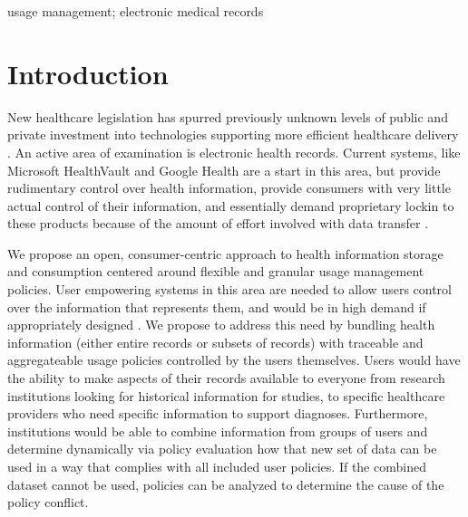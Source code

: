 \documentclass[10pt, conference, compsocconf]{IEEEtran}
\begin{document}
\begin{IEEEkeywords}
usage management; electronic medical records

\end{IEEEkeywords}


%
\IEEEpeerreviewmaketitle

\section{Introduction}
New healthcare legislation has spurred previously unknown levels of public and private investment into technologies supporting more efficient healthcare delivery \cite{Emr:Web:Recovery}.   An active area of examination is electronic health records.  Current systems, like Microsoft HealthVault and Google Health are a start in this area, but provide rudimentary control over health information, provide consumers with very little actual control of their information, and essentially demand proprietary lockin to these products because of the amount of effort involved with data transfer \cite{Emr:EvaluationHealthInf}.

We propose an open, consumer-centric approach to health information storage and consumption centered around flexible and granular usage management policies.  User empowering systems in this area are needed to allow users control over the information that represents them, and would be in high demand if appropriately designed \cite{Emr:PyAmWaCr}.  We propose to address this need by bundling health information (either entire records or subsets of records) with traceable and aggregateable usage policies controlled by the users themselves.  Users would have the ability to make aspects of their records available to everyone from research institutions looking for historical information for studies, to specific healthcare providers who need specific information to support diagnoses.  Furthermore, institutions would be able to combine information from groups of users and determine dynamically via policy evaluation how that new set of data can be used in a way that complies with all included user policies.  If the combined dataset cannot be used, policies can be analyzed to determine the cause of the policy conflict.
\end{document}
